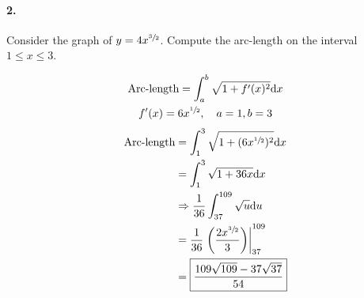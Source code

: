     \paragraph*{2.}
    Consider the graph of $y=4x^{\sfrac{3}{2}}$. Compute the arc-length on the interval $1 \leq x \leq 3$.
    \\
    \begin{mdframed}
        \begin{equation*}
            \begin{gathered}
                \text{Arc-length} = \int_{a}^{b}\sqrt{1 + f'(x)^2} \mathrm{d}x  \\
                f'(x) = 6x^{\sfrac{1}{2}}, \quad a = 1, b = 3
            \end{gathered}
        \end{equation*}
        \begin{align*}
            \text{Arc-length}   & = \int_{1}^{3}\sqrt{1 + (6x^{\sfrac{1}{2}})^2}\mathrm{d}x \\
                                & = \int_{1}^{3}\sqrt{1 + 36x}\mathrm{d}x                   \\
                                & \Rightarrow \frac{1}{36}\int_{37}^{109}\sqrt{u}\mathrm{d}u\\
                                & = \frac{1}{36}\left.\left(\frac{2x^{\sfrac{3}{2}}}{3}\right)\right|_{37}^{109}    \\
                                & = \boxed{\frac{109\sqrt{109} - 37\sqrt{37}}{54}}
        \end{align*}
    \end{mdframed}

    \pagebreak

